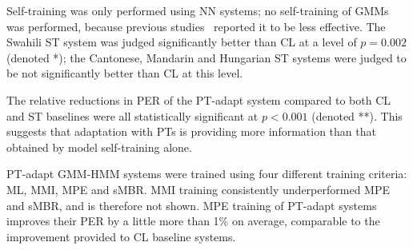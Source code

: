 Self-training was only performed
using NN systems; no self-training of GMMs was performed, because
previous studies~\cite{Huang2013} reported it to be less effective.
The Swahili {\sc ST} system was judged significantly better
than {\sc CL} at a level of $p=0.002$ (denoted *); the Cantonese,
Mandarin and
Hungarian {\sc ST} systems were judged to be not significantly better
than {\sc CL} at this level.

The relative reductions in PER
of the {\sc PT-adapt} system
compared to both {\sc CL} and {\sc ST} baselines
were all statistically
significant at $p<0.001$ (denoted **).  This suggests that adaptation
with PTs is providing more information than that obtained by model
self-training alone.

{\color{blue} PT-adapt GMM-HMM systems were trained using four
different training criteria: ML, MMI, MPE and sMBR.  MMI training
consistently underperformed MPE and sMBR, and is therefore not shown.
MPE training of {\sc PT-adapt} systems improves their PER by a little
more than 1\% on average, comparable to the improvement provided
to {\sc CL} baseline systems.}

